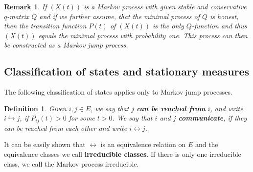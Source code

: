 \documentclass[12pt,a4paper]{scrartcl}
\newtheorem{definition}[theorem]{Definition}
\newtheorem {remark}[theorem]{Remark}
\numberwithin{equation}{section}
\begin{document}
\begin{remark}
\label{RemarktoSetting}
If $\left(X\left(t\right)\right)$ is a Markov process with given stable and conservative $q$-matrix $Q$ and if we further assume, that the minimal process of $Q$ is honest, then the transition function $P\left(t\right)$ of $\left(X\left(t\right)\right)$ is the only $Q$-function and thus $\left(X\left(t\right)\right)$ equals the minimal process with probability one. This process can then be constructed as a Markov jump process.
\end{remark}

\subsection{Classification of states and stationary measures}

The following classification of states applies only to Markov jump processes.

\begin{definition}
Given $i,j \in E$, we say that $j$ \textbf{can be reached from} $i$, and write $i\hookrightarrow j $, if $P_{ij}\left(t\right) > 0 $ for some $ t > 0 $. We say that $i$ and $j$ \textbf{communicate}, if they can be reached from each other and write $i\leftrightarrow j$.
\end{definition}


It can be easily shown that $\leftrightarrow$ is an equivalence relation on $E$ and the equivalence classes we call \textbf{irreducible classes}. If there is only one irreducible class, we call the Markov process irreducible.
\end{document}
